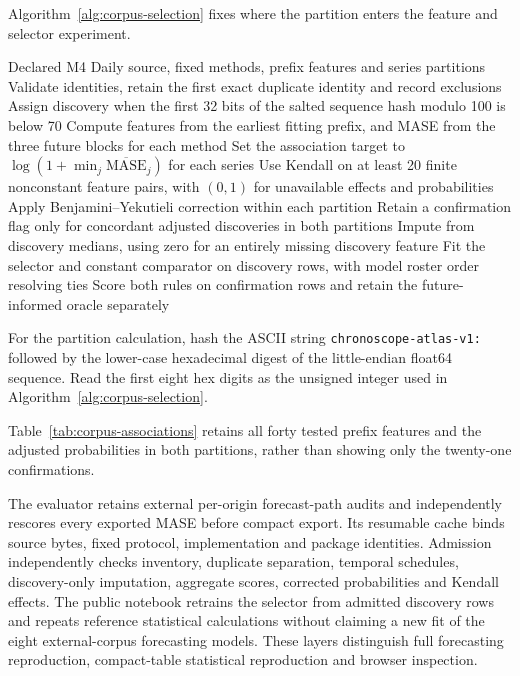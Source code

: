 \documentclass[11pt,a4paper]{article}
\begin{document}
Algorithm~\ref{alg:corpus-selection} fixes where the partition enters
the feature and selector experiment.
\begin{algorithm}[htbp]
\caption{Compare the discovery-trained selector and constant method on a separate set of admitted series.}
\label{alg:corpus-selection}
\begin{algorithmic}[1]
\Require Declared M4 Daily source, fixed methods, prefix features and series partitions
\State Validate identities, retain the first exact duplicate identity and record exclusions
\State Assign discovery when the first 32 bits of the salted sequence hash modulo 100 is below 70
\State Compute features from the earliest fitting prefix, and MASE from the three future blocks for each method
\State Set the association target to $\log(1+\min_j\overline{\mathrm{MASE}}_j)$ for each series
\State Use Kendall on at least 20 finite nonconstant feature pairs, with $(0,1)$ for unavailable effects and probabilities
\State Apply Benjamini--Yekutieli correction within each partition
\State Retain a confirmation flag only for concordant adjusted discoveries in both partitions
\State Impute from discovery medians, using zero for an entirely missing discovery feature
\State Fit the selector and constant comparator on discovery rows, with model roster order resolving ties
\State Score both rules on confirmation rows and retain the future-informed oracle separately
\end{algorithmic}
\end{algorithm}

For the partition calculation, hash the ASCII string
\texttt{chronoscope-atlas-v1:} followed by the lower-case hexadecimal
digest of the little-endian float64 sequence. Read the first eight hex
digits as the unsigned integer used in Algorithm~\ref{alg:corpus-selection}.


\clearpage
Table~\ref{tab:corpus-associations} retains all forty tested prefix features and the adjusted probabilities in both partitions, rather than showing only the twenty-one confirmations.


\begin{samepage}
The evaluator retains external per-origin forecast-path audits and independently rescores every exported MASE before compact export. Its resumable cache binds source bytes, fixed protocol, implementation and package identities. Admission independently checks inventory, duplicate separation, temporal schedules, discovery-only imputation, aggregate scores, corrected probabilities and Kendall effects. The public notebook retrains the selector from admitted discovery rows and repeats reference statistical calculations without claiming a new fit of the eight external-corpus forecasting models. These layers distinguish full forecasting reproduction, compact-table statistical reproduction and browser inspection.\par
\end{samepage}
\end{document}
